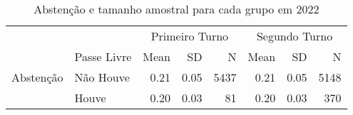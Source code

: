 
\begin{table}
\centering
\caption{Abstenção e tamanho amostral para cada grupo em 2022}
\begin{tabular}[t]{llrrrrrr}
\toprule
\multicolumn{2}{c}{ } & \multicolumn{3}{c}{Primeiro Turno} & \multicolumn{3}{c}{Segundo Turno} \\
\cmidrule(l{3pt}r{3pt}){3-5} \cmidrule(l{3pt}r{3pt}){6-8}
  & Passe Livre & Mean & SD & N & Mean & SD & N\\
\midrule
Abstenção & Não Houve & \num{0.21} & \num{0.05} & 5437 & \num{0.21} & \num{0.05} & 5148\\
 & Houve & \num{0.20} & \num{0.03} & 81 & \num{0.20} & \num{0.03} & 370\\
\bottomrule
\end{tabular}
\label{tab_descritiva}
\end{table}